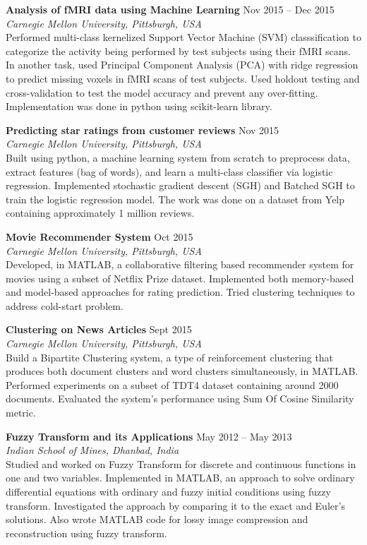 \documentclass[margin,line]{resume}
\begin{document}
\begin{resume}
		\textbf{Analysis of fMRI data using Machine Learning} \hfill Nov 2015 -- Dec 2015 \\
  		\textit{Carnegie Mellon University, Pittsburgh, USA} \\
		Performed multi-class kernelized Support Vector Machine (SVM) classsification to categorize the activity being performed by test subjects using their fMRI scans. In another task, used Principal Component 				Analysis (PCA) with ridge regression to predict missing voxels in fMRI scans of test subjects. Used holdout testing and cross-validation to test the model accuracy and prevent any over-fitting. Implementation 			was done in python using scikit-learn library.

		\textbf{Predicting star ratings from customer reviews} \hfill Nov 2015 \\
  		\textit{Carnegie Mellon University, Pittsburgh, USA} \\
		Built using python, a machine learning system from scratch to preprocess data, extract features (bag of words), and learn a multi-class classifier via logistic regression. Implemented stochastic gradient 					descent (SGH) and Batched SGH to train the logistic regression model. The work was done on a dataset from Yelp containing approximately 1 million reviews.

		\textbf{Movie Recommender System} \hfill Oct 2015 \\
  		\textit{Carnegie Mellon University, Pittsburgh, USA} \\
		Developed, in MATLAB, a collaborative filtering based recommender system for movies using a subset of Netflix Prize dataset. Implemented both memory-based and model-based approaches for rating 				prediction. Tried clustering techniques to address cold-start problem. 
	
		\textbf{Clustering on News Articles} \hfill Sept 2015 \\
  		\textit{Carnegie Mellon University, Pittsburgh, USA} \\
		Build a Bipartite Clustering system, a type of reinforcement clustering that produces both document clusters and word clusters simultaneously, in MATLAB. Performed experiments on a subset of TDT4 dataset 		containing around 2000 documents. Evaluated the system's performance using Sum Of Cosine Similarity metric. 

		\textbf{Fuzzy Transform and its Applications} \hfill May 2012 -- May 2013 \\
  		\textit{Indian School of Mines, Dhanbad, India} \\
		Studied and worked on Fuzzy Transform for discrete and continuous functions in one and two \mbox{variables}. Implemented in MATLAB, an approach to solve ordinary differential equations with 						\mbox{ordinary} and fuzzy initial conditions using fuzzy transform. Investigated the approach by comparing it to the exact and Euler's solutions. Also wrote MATLAB code for lossy image compression and reconstruction using fuzzy transform.


\end{resume}
\end{document}

